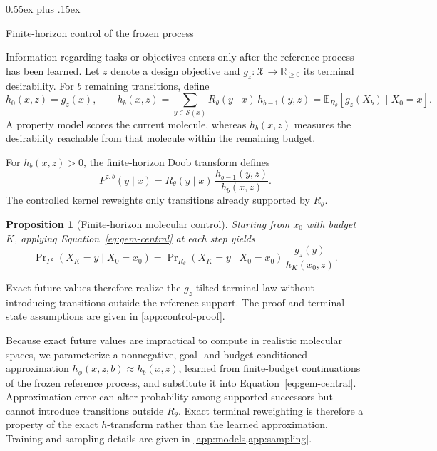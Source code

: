 \documentclass{article}
\makeatletter
\newtheorem{proposition}[theorem]{Proposition}
\theoremstyle{definition}
\theoremstyle{remark}
\def\subsection{\@startsection{subsection}{2}{\z@}{-1.2ex plus -0.4ex minus -.2ex}%
  {0.55ex plus .15ex}{\normalsize\sc\raggedright}}
\makeatother
\begin{document}
\subsection{Finite-horizon control of the frozen process}
\label{sec:gem-control}

Information regarding tasks or objectives enters only after the reference process has been learned. Let $z$ denote a design objective and $g_z:\mathcal X\rightarrow\mathbb R_{\geq0}$
its terminal desirability. For $b$ remaining transitions, define
\begin{equation}
  h_0(x,z)=g_z(x),
  \qquad
  h_b(x,z)
  =
  \sum_{y\in\mathcal S(x)} R_\theta(y\mid x)\, h_{b-1}(y,z)
  =
  \mathbb E_{R_\theta}\!\left[ g_z(X_b)\mid X_0=x \right].
  \label{eq:gem-backward}
\end{equation}
A property model scores the current molecule, whereas $h_b(x,z)$ measures the
desirability reachable from that molecule within the remaining budget.

For $h_b(x,z)>0$, the finite-horizon Doob transform defines
\begin{equation}
  P^{z,b}(y\mid x)
  =
  R_\theta(y\mid x)\,
  \frac{h_{b-1}(y,z)}{h_b(x,z)} .
  \label{eq:gem-central}
\end{equation}
The controlled kernel reweights only transitions already supported by
$R_\theta$.

\begin{proposition}[Finite-horizon molecular control]
\label{prop:gem-doob}
Starting from $x_0$ with budget $K$, applying
Equation~\eqref{eq:gem-central} at each step yields
\[
  \Pr\nolimits_{P^z}(X_K=y\mid X_0=x_0)
  =
  \Pr\nolimits_{R_\theta}(X_K=y\mid X_0=x_0)\,
  \frac{g_z(y)}{h_K(x_0,z)} .
\]
\end{proposition}

Exact future values therefore realize the $g_z$-tilted terminal law without
introducing transitions outside the reference support. The proof and
terminal-state assumptions are given in \cref{app:control-proof}.

Because exact future values are impractical to compute in realistic molecular spaces, we
parameterize a nonnegative, goal- and budget-conditioned
approximation $h_\phi(x,z,b)\approx h_b(x,z)$, learned from finite-budget
continuations of the frozen reference process, and substitute it into
Equation~\eqref{eq:gem-central}.
Approximation error can alter probability among supported successors but cannot
introduce transitions outside $R_\theta$. Exact terminal reweighting is
therefore a property of the exact $h$-transform rather than the learned
approximation. Training and sampling details are given in \cref{app:models,app:sampling}.
\end{document}
